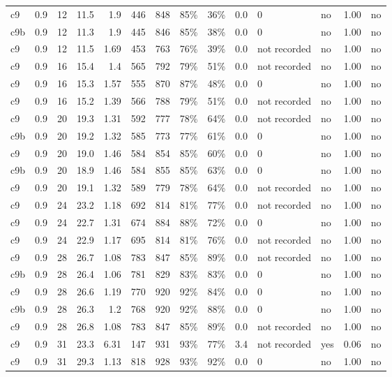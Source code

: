 \begin{landscape}
\begin{longtable}{llrrrrrrrrllll}
c9 & 0.9 & 12 & 11.5 & 1.9 & 446 & 848 & 85\% & 36\% & 0.0 & 0 & no & 1.00 & no \\
c9b & 0.9 & 12 & 11.3 & 1.9 & 445 & 846 & 85\% & 38\% & 0.0 & 0 & no & 1.00 & no \\
c9 & 0.9 & 12 & 11.5 & 1.69 & 453 & 763 & 76\% & 39\% & 0.0 & not recorded & no & 1.00 & no \\
c9 & 0.9 & 16 & 15.4 & 1.4 & 565 & 792 & 79\% & 51\% & 0.0 & not recorded & no & 1.00 & no \\
c9 & 0.9 & 16 & 15.3 & 1.57 & 555 & 870 & 87\% & 48\% & 0.0 & 0 & no & 1.00 & no \\
c9 & 0.9 & 16 & 15.2 & 1.39 & 566 & 788 & 79\% & 51\% & 0.0 & not recorded & no & 1.00 & no \\
c9 & 0.9 & 20 & 19.3 & 1.31 & 592 & 777 & 78\% & 64\% & 0.0 & not recorded & no & 1.00 & no \\
c9b & 0.9 & 20 & 19.2 & 1.32 & 585 & 773 & 77\% & 61\% & 0.0 & 0 & no & 1.00 & no \\
c9 & 0.9 & 20 & 19.0 & 1.46 & 584 & 854 & 85\% & 60\% & 0.0 & 0 & no & 1.00 & no \\
c9b & 0.9 & 20 & 18.9 & 1.46 & 584 & 855 & 85\% & 63\% & 0.0 & 0 & no & 1.00 & no \\
c9 & 0.9 & 20 & 19.1 & 1.32 & 589 & 779 & 78\% & 64\% & 0.0 & not recorded & no & 1.00 & no \\
c9 & 0.9 & 24 & 23.2 & 1.18 & 692 & 814 & 81\% & 77\% & 0.0 & not recorded & no & 1.00 & no \\
c9 & 0.9 & 24 & 22.7 & 1.31 & 674 & 884 & 88\% & 72\% & 0.0 & 0 & no & 1.00 & no \\
c9 & 0.9 & 24 & 22.9 & 1.17 & 695 & 814 & 81\% & 76\% & 0.0 & not recorded & no & 1.00 & no \\
c9 & 0.9 & 28 & 26.7 & 1.08 & 783 & 847 & 85\% & 89\% & 0.0 & not recorded & no & 1.00 & no \\
c9b & 0.9 & 28 & 26.4 & 1.06 & 781 & 829 & 83\% & 83\% & 0.0 & 0 & no & 1.00 & no \\
c9 & 0.9 & 28 & 26.6 & 1.19 & 770 & 920 & 92\% & 84\% & 0.0 & 0 & no & 1.00 & no \\
c9b & 0.9 & 28 & 26.3 & 1.2 & 768 & 920 & 92\% & 88\% & 0.0 & 0 & no & 1.00 & no \\
c9 & 0.9 & 28 & 26.8 & 1.08 & 783 & 847 & 85\% & 89\% & 0.0 & not recorded & no & 1.00 & no \\
c9 & 0.9 & 31 & 23.3 & 6.31 & 147 & 931 & 93\% & 77\% & 3.4 & not recorded & yes & 0.06 & no \\
c9 & 0.9 & 31 & 29.3 & 1.13 & 818 & 928 & 93\% & 92\% & 0.0 & 0 & no & 1.00 & no \\

\end{longtable}
\end{landscape}
